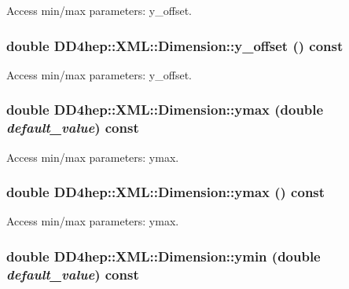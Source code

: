 Access min/max parameters: y\_\-offset. \hypertarget{struct_d_d4hep_1_1_x_m_l_1_1_dimension_afc932cda1e98c7143e9837e9098884e4}{
\subsubsection[{y\_\-offset}]{\setlength{\rightskip}{0pt plus 5cm}double DD4hep::XML::Dimension::y\_\-offset () const}}
\label{struct_d_d4hep_1_1_x_m_l_1_1_dimension_afc932cda1e98c7143e9837e9098884e4}


Access min/max parameters: y\_\-offset. \hypertarget{struct_d_d4hep_1_1_x_m_l_1_1_dimension_a52fba9090a56b6d166234fc4ff483ea2}{
\subsubsection[{ymax}]{\setlength{\rightskip}{0pt plus 5cm}double DD4hep::XML::Dimension::ymax (double {\em default\_\-value}) const}}
\label{struct_d_d4hep_1_1_x_m_l_1_1_dimension_a52fba9090a56b6d166234fc4ff483ea2}


Access min/max parameters: ymax. \hypertarget{struct_d_d4hep_1_1_x_m_l_1_1_dimension_a4cabc81bbdf7cf185ad26499e497d7de}{
\subsubsection[{ymax}]{\setlength{\rightskip}{0pt plus 5cm}double DD4hep::XML::Dimension::ymax () const}}
\label{struct_d_d4hep_1_1_x_m_l_1_1_dimension_a4cabc81bbdf7cf185ad26499e497d7de}


Access min/max parameters: ymax. \hypertarget{struct_d_d4hep_1_1_x_m_l_1_1_dimension_a29799f2d4ebe2806dce1c7eebefbf23b}{
\subsubsection[{ymin}]{\setlength{\rightskip}{0pt plus 5cm}double DD4hep::XML::Dimension::ymin (double {\em default\_\-value}) const}}
\label{struct_d_d4hep_1_1_x_m_l_1_1_dimension_a29799f2d4ebe2806dce1c7eebefbf23b}


